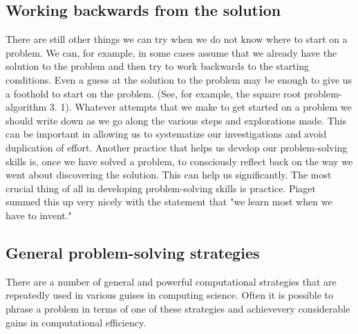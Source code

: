 \documentclass{book}
\begin{document}
\subsection{Working backwards from the  solution}
There are still other things we can try when we do not know where to start on a problem. We can, for example, in some cases assume that we already have the solution to the problem and then try to work backwards to the starting conditions. Even a guess at the solution to the problem may be enough to give us a foothold to start on the problem. (See, for example, the square root problem-algorithm 3. 1). Whatever attempts that we make to get started on a problem we should write down as we go along the various steps and explorations made. This can be important in allowing us to systematize our investigations and avoid duplication of effort. Another practice that helps us develop our problem-solving skills is, once we have solved a problem, to consciously reflect back on the way we went about discovering the solution. This can help us significantly. The most crucial thing of all in developing problem-solving skills is practice. Piaget summed this up very nicely with the statement that "we learn most when we have to invent."

\subsection{General problem-solving strategies}
There are a number of general and powerful computational strategies that are repeatedly used in various guises in computing science. Often it is possible to phrase a problem in terms of one of these strategies and achievevery considerable gains in computational efficiency.\par
\end{document}

